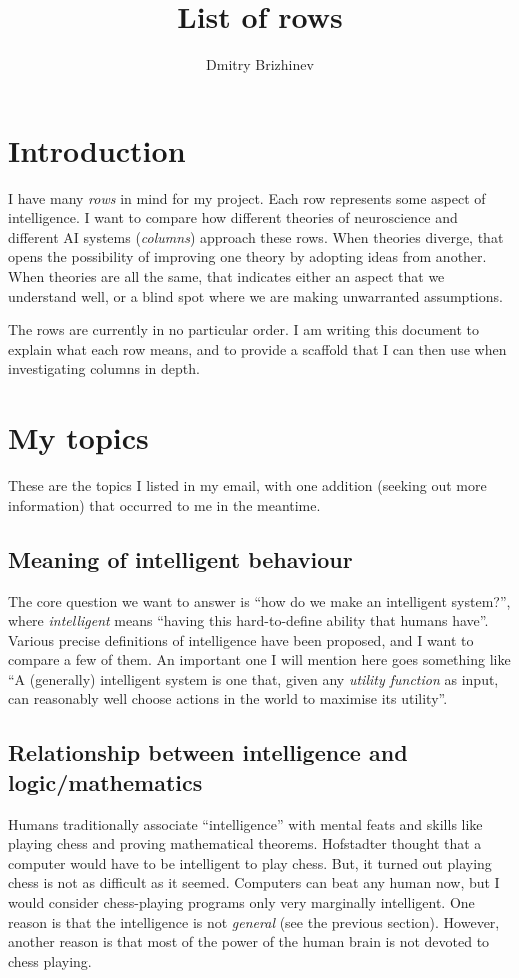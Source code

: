 \documentclass[10pt,a4paper]{article}
\newcommand{\nquote}[1]{``{#1}''}
\begin{document}
\title{\vspace{-10ex}List of rows}
\author{Dmitry Brizhinev}
\maketitle

\section{Introduction}
I have many \emph{rows} in mind for my project. Each row represents some aspect of intelligence. I want to compare how different theories of neuroscience and different AI systems (\emph{columns}) approach these rows. When theories diverge, that opens the possibility of improving one theory by adopting ideas from another. When theories are all the same, that indicates either an aspect that we understand well, or a blind spot where we are making unwarranted assumptions.

The rows are currently in no particular order. I am writing this document to explain what each row means, and to provide a scaffold that I can then use when investigating columns in depth.

\section{My topics}
These are the topics I listed in my email, with one addition (seeking out more information) that occurred to me in the meantime.

\subsection{Meaning of intelligent behaviour}
The core question we want to answer is \nquote{how do we make an intelligent system?}, where \emph{intelligent} means \nquote{having this hard-to-define ability that humans have}. Various precise definitions of intelligence have been proposed, and I want to compare a few of them. An important one I will mention here goes something like \nquote{A (generally) intelligent system is one that, given any \emph{utility function} as input, can reasonably well choose actions in the world to maximise its utility}.

\subsection{Relationship between intelligence and logic/mathematics}
Humans traditionally associate \nquote{intelligence} with mental feats and skills like playing chess and proving mathematical theorems. Hofstadter \cite{hofstadter} thought that a computer would have to be intelligent to play chess. But, it turned out playing chess is not as difficult as it seemed. Computers can beat any human now, but I would consider chess-playing programs only very marginally intelligent. One reason is that the intelligence is not \emph{general} (see the previous section). However, another reason is that most of the power of the human brain is not devoted to chess playing.
\end{document}
